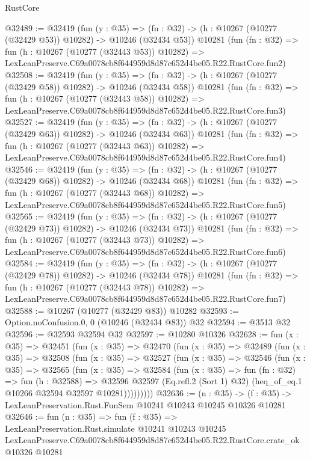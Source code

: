 \begin{lexlean}{RustCore}
\begin{coremodule}
@32489 := @32419
    (fun (y : @35) =>
    (fn : @32) -> (h : @10267 (@10277 (@32429 @53)) @10282) -> @10246 (@32434 @53))
    @10281
    (fun (fn : @32) =>
    fun (h : @10267 (@10277 (@32443 @53)) @10282) =>
    LexLeanPreserve.C69a0078cb8f644959d8d87c652d4be05.R22.RustCore.fun2)
@32508 := @32419
    (fun (y : @35) =>
    (fn : @32) -> (h : @10267 (@10277 (@32429 @58)) @10282) -> @10246 (@32434 @58))
    @10281
    (fun (fn : @32) =>
    fun (h : @10267 (@10277 (@32443 @58)) @10282) =>
    LexLeanPreserve.C69a0078cb8f644959d8d87c652d4be05.R22.RustCore.fun3)
@32527 := @32419
    (fun (y : @35) =>
    (fn : @32) -> (h : @10267 (@10277 (@32429 @63)) @10282) -> @10246 (@32434 @63))
    @10281
    (fun (fn : @32) =>
    fun (h : @10267 (@10277 (@32443 @63)) @10282) =>
    LexLeanPreserve.C69a0078cb8f644959d8d87c652d4be05.R22.RustCore.fun4)
@32546 := @32419
    (fun (y : @35) =>
    (fn : @32) -> (h : @10267 (@10277 (@32429 @68)) @10282) -> @10246 (@32434 @68))
    @10281
    (fun (fn : @32) =>
    fun (h : @10267 (@10277 (@32443 @68)) @10282) =>
    LexLeanPreserve.C69a0078cb8f644959d8d87c652d4be05.R22.RustCore.fun5)
@32565 := @32419
    (fun (y : @35) =>
    (fn : @32) -> (h : @10267 (@10277 (@32429 @73)) @10282) -> @10246 (@32434 @73))
    @10281
    (fun (fn : @32) =>
    fun (h : @10267 (@10277 (@32443 @73)) @10282) =>
    LexLeanPreserve.C69a0078cb8f644959d8d87c652d4be05.R22.RustCore.fun6)
@32584 := @32419
    (fun (y : @35) =>
    (fn : @32) -> (h : @10267 (@10277 (@32429 @78)) @10282) -> @10246 (@32434 @78))
    @10281
    (fun (fn : @32) =>
    fun (h : @10267 (@10277 (@32443 @78)) @10282) =>
    LexLeanPreserve.C69a0078cb8f644959d8d87c652d4be05.R22.RustCore.fun7)
@32588 := @10267 (@10277 (@32429 @83)) @10282
@32593 := Option.noConfusion.{0, 0} (@10246 (@32434 @83)) @32
@32594 := @3513 @32
@32596 := @32593 @32594 @32
@32597 := @10280 @10326
@32628 := fun (x : @35) =>
  @32451
    (fun (x : @35) =>
    @32470
      (fun (x : @35) =>
      @32489
        (fun (x : @35) =>
        @32508
          (fun (x : @35) =>
          @32527
            (fun (x : @35) =>
            @32546
              (fun (x : @35) =>
              @32565
                (fun (x : @35) =>
                @32584
                  (fun (x : @35) =>
                  fun (fn : @32) =>
                  fun (h : @32588) =>
                  @32596
                    @32597
                    (Eq.refl.{2} (Sort 1) @32)
                    (heq_of_eq.{1} @10266 @32594 @32597 @10281)))))))))
@32636 := (n : @35) ->
  (f : @35) -> LexLeanPreservation.Rust.FunSem @10241 @10243 @10245 @10326 @10281
@32646 := fun (n : @35) =>
  fun (f : @35) =>
  LexLeanPreservation.Rust.simulate
    @10241
    @10243
    @10245
    LexLeanPreserve.C69a0078cb8f644959d8d87c652d4be05.R22.RustCore.crate_ok
    @10326
    @10281
\end{coremodule}
\end{lexlean}
